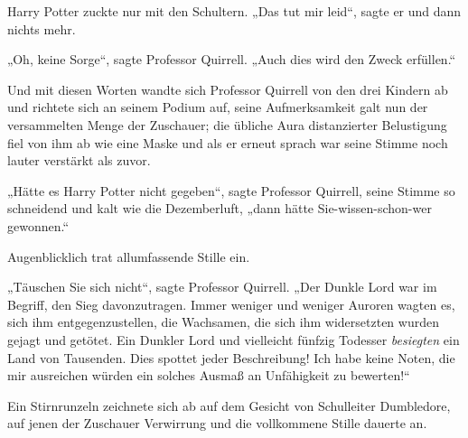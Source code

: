 Harry Potter zuckte nur mit den Schultern. „Das tut mir leid“, sagte er und dann nichts mehr.

„Oh, keine Sorge“, sagte Professor Quirrell. „Auch dies wird den Zweck erfüllen.“

Und mit diesen Worten wandte sich Professor Quirrell von den drei Kindern ab und richtete sich an seinem Podium auf, seine Aufmerksamkeit galt nun der versammelten Menge der Zuschauer; die übliche Aura distanzierter Belustigung fiel von ihm ab wie eine Maske und als er erneut sprach war seine Stimme noch lauter verstärkt als zuvor.

„Hätte es Harry Potter nicht gegeben“, sagte Professor Quirrell, seine Stimme so schneidend und kalt wie die Dezemberluft, „dann hätte Sie-wissen-schon-wer gewonnen.“

Augenblicklich trat allumfassende Stille ein.

\later

„Täuschen Sie sich nicht“, sagte Professor Quirrell. „Der Dunkle Lord war im Begriff, den Sieg davonzutragen. Immer weniger und weniger Auroren wagten es, sich ihm entgegenzustellen, die Wachsamen, die sich ihm widersetzten wurden gejagt und getötet. Ein Dunkler Lord und vielleicht fünfzig Todesser \emph{besiegten} ein Land von Tausenden. Dies spottet jeder Beschreibung! Ich habe keine Noten, die mir ausreichen würden ein solches Ausmaß an Unfähigkeit zu bewerten!“

Ein Stirnrunzeln zeichnete sich ab auf dem Gesicht von Schulleiter Dumbledore, auf jenen der Zuschauer Verwirrung und die vollkommene Stille dauerte an.

